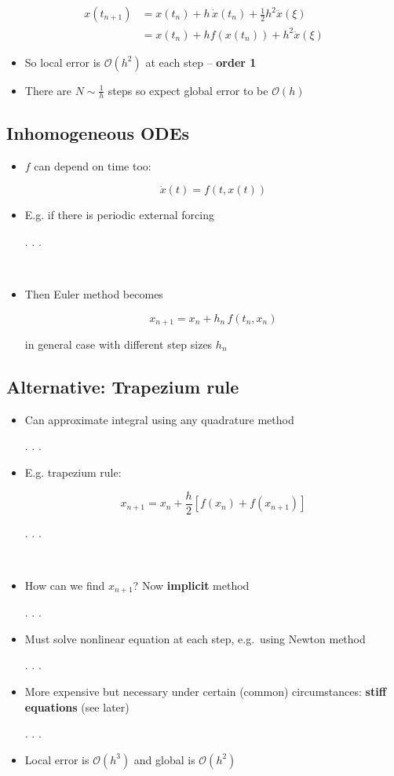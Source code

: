 \documentclass[
]{article}
\begin{document}
\begin{align*}
    x(t_{n+1}) &= x(t_n) + h \, \dot{x}(t_n) + \frac{1}{2}   h^2 \ddot{x}(\xi) \\
    &= x(t_n) + h f(x(t_n)) + h^2 \ddot{x}(\xi)
\end{align*}

\begin{itemize}
\item
  So local error is \(\mathcal{O}(h^2)\) at each step -- \textbf{order
  1}
\item
  There are \(N \sim \frac{1}{h}\) steps so expect global error to be
  \(\mathcal{O}(h)\)
\end{itemize}

\hypertarget{inhomogeneous-odes}{%
\subsection{Inhomogeneous ODEs}\label{inhomogeneous-odes}}

\begin{itemize}
\item
  \(f\) can depend on time too:

  \[\dot{x}(t) = f(t, x(t))\]
\item
  E.g. if there is periodic external forcing

  . . .

  ~\\
\item
  Then Euler method becomes

  \[x_{n+1} = x_n + h_n \, f(t_n, x_n)\]

  in general case with different step sizes \(h_n\)
\end{itemize}

\hypertarget{alternative-trapezium-rule}{%
\subsection{Alternative: Trapezium
rule}\label{alternative-trapezium-rule}}

\begin{itemize}
\item
  Can approximate integral using any quadrature method

  . . .
\item
  E.g. trapezium rule:

  \[x_{n+1} = x_n + \textstyle \frac{h}{2} \left[ f(x_n) + f(x_{n+1}) \right]\]

  . . .

  ~\\
\item
  How can we find \(x_{n+1}\)? Now \textbf{implicit} method

  . . .
\item
  Must solve nonlinear equation at each step, e.g.~using Newton method

  . . .
\item
  More expensive but necessary under certain (common) circumstances:
  \textbf{stiff equations} (see later)

  . . .
\item
  Local error is \(\mathcal{O}(h^3)\) and global is \(\mathcal{O}(h^2)\)
\end{itemize}
\end{document}
